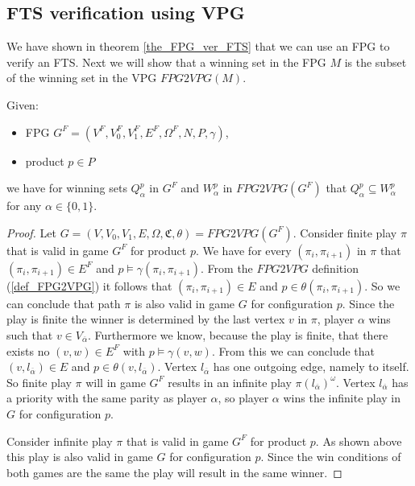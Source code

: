 \subsection{FTS verification using VPG}
We have shown in theorem \ref{the_FPG_ver_FTS} that we can use an FPG to verify an FTS. Next we will show that a winning set in the FPG $M$ is the subset of the winning set in the VPG $\textit{FPG2VPG}(M)$.
\begin{theorem}
	\label{the_FPG_sub_VPG}
	Given:
	\begin{itemize}
		\item FPG $G^F = (V^F, V_0^F, V_1^F, E^F, \Omega^F, N, P, \gamma)$,
		\item product $p \in P$
	\end{itemize}
	we have for winning sets $Q_\alpha^{p}$ in $G^F$ and $W_\alpha^{p}$ in $\textit{FPG2VPG}(G^F)$ that $Q_\alpha^{p} \subseteq W_\alpha^{p}$ for any $\alpha \in \{0,1\}$.
	\begin{proof}
		Let $G = (V,V_0,V_1, E, \Omega, \mathfrak{C},\theta) = \textit{FPG2VPG}(G^F)$. Consider finite play $\pi$ that is valid in game $G^F$ for product $p$. We have for every $(\pi_i, \pi_{i+1})$ in $\pi$ that $(\pi_i, \pi_{i+1}) \in E^F$ and $p \models \gamma(\pi_i, \pi_{i+1})$. From the $\textit{FPG2VPG}$ definition (\ref{def_FPG2VPG}) it follows that $(\pi_i, \pi_{i+1}) \in E$ and $p \in \theta(\pi_i, \pi_{i+1})$. So we can conclude that path $\pi$ is also valid in game $G$ for configuration $p$. Since the play is finite the winner is determined by the last vertex $v$ in $\pi$, player $\alpha$ wins such that $v \in V_{\overline{\alpha}}$. Furthermore we know, because the play is finite, that there exists no $(v,w) \in E^F$ with $p \models \gamma(v,w)$. From this we can conclude that $(v, l_{\overline{\alpha}}) \in E$ and $p \in \theta(v, l_{\overline{\alpha}})$. Vertex $l_{\overline{\alpha}}$ has one outgoing edge, namely to itself. So finite play $\pi$ will in game $G^F$ results in an infinite play $\pi(l_{\overline{\alpha}})^\omega$. Vertex $l_{\overline{\alpha}}$ has a priority with the same parity as player $\alpha$, so player $\alpha$ wins the infinite play in $G$ for configuration $p$.
		
		Consider infinite play $\pi$ that is valid in game $G^F$ for product $p$. As shown above this play is also valid in game $G$ for configuration $p$. Since the win conditions of both games are the same the play will result in the same winner.
		

\end{proof}
\end{theorem}
